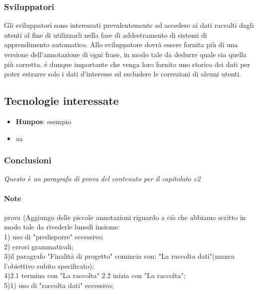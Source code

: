 \subsubsection{Sviluppatori}
Gli sviluppatori sono interessati prevalentemente ad accedere ai dati raccolti dagli utenti al fine di utilizzarli nella fase di addestramento di sistemi di apprendimento automatico. Allo sviluppatore dovrà essere fornita più di una versione dell’annotazione di ogni frase, in modo tale da dedurre quale sia quella più corretta. é dunque importante che venga loro fornito uno storico dei dati per poter estrarre solo i dati d'interesse ed escludere le correzioni di alcuni utenti. 
\subsection{Tecnologie interessate}
\begin{itemize}
	\item \textbf{Hunpos}: esempio
	\item aa
\end{itemize}
\subsubsection{Conclusioni}
\textit{Questo è un paragrafo di prova del contenuto per il capitolato c2}
\paragraph{Note}
prova (Aggiungo delle piccole annotazioni riguardo a ciò che abbiamo scritto in modo tale da rivederle lunedì insieme:\\ 
1) uso di "predisporre" eccessivo;\\
2) errori grammaticali;\\
3)il paragrafo "Finalità di progetto" comincia con: "La raccolta dati"(manca l'obiettivo subito specificato);\\
4)2.1 termina con "La raccolta" 2.2 inizia con "La raccolta";\\
5)1) uso di "raccolta dati" eccessivo;\\